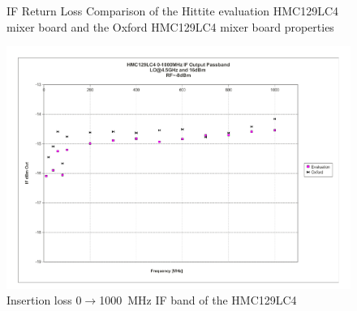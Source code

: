 \begin{figure}
\centering
{}
\hspace{0.1cm}

 \caption{IF Return Loss Comparison of the Hittite evaluation HMC129LC4 mixer board and the Oxford HMC129LC4 mixer board properties}
\end{figure}

\begin{figure}[ht]
 \centering
\includegraphics[height=0.5\textheight]{images/mixers/pg_0008.pdf}
 \caption{Insertion loss 0$\rightarrow$1000~MHz IF band of the HMC129LC4}
\end{figure}

